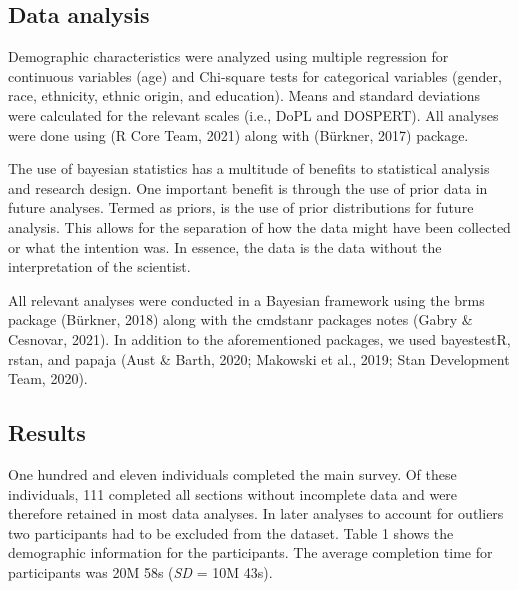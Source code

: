 \documentclass[
  donotrepeattitle,doc, 12pt, a4paper,floatsintext]{apa7}
\begin{document}
\hypertarget{data-analysis}{%
\subsection{Data analysis}\label{data-analysis}}

Demographic characteristics were analyzed using multiple regression for continuous variables (age) and Chi-square tests for categorical variables (gender, race, ethnicity, ethnic origin, and education). Means and standard deviations were calculated for the relevant scales (i.e., DoPL and DOSPERT). All analyses were done using (R Core Team, 2021) along with (Bürkner, 2017) package.

The use of bayesian statistics has a multitude of benefits to statistical analysis and research design. One important benefit is through the use of prior data in future analyses. Termed as priors, is the use of prior distributions for future analysis. This allows for the separation of how the data might have been collected or what the intention was. In essence, the data is the data without the interpretation of the scientist.

All relevant analyses were conducted in a Bayesian framework using the brms package (Bürkner, 2018) along with the cmdstanr packages notes (Gabry \& Cesnovar, 2021). In addition to the aforementioned packages, we used bayestestR, rstan, and papaja (Aust \& Barth, 2020; Makowski et al., 2019; Stan Development Team, 2020).

\hypertarget{results}{%
\subsection{Results}\label{results}}

One hundred and eleven individuals completed the main survey. Of these individuals, 111 completed all sections without incomplete data and were therefore retained in most data analyses. In later analyses to account for outliers two participants had to be excluded from the dataset. Table 1 shows the demographic information for the participants. The average completion time for participants was 20M 58s (\emph{SD} = 10M 43s).
\end{document}
